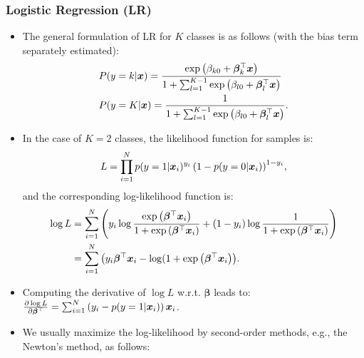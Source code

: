         \subsubsection{Logistic Regression (LR)}
            \begin{itemize}
                \item The general formulation of LR for $K$ classes is as follows (with the bias term separately estimated):
                    \begin{equation}
                        \begin{aligned}
                            & P(y=k | \bm{x}) = \frac{  \text{exp}\left( \beta_{k0} + \bm{\beta}_k^\top \bm{x}  \right) }{1 + \sum_{l=1}^{K-1}{ \text{exp}\left( \beta_{l0} + \bm{\beta}_l^\top \bm{x}  \right)  }} \\
                            & P(y=K | \bm{x}) = \frac{1}{1 + \sum_{l=1}^{K-1}{ \text{exp}\left( \beta_{l0} + \bm{\beta}_l^\top \bm{x}  \right)  }}.
                        \end{aligned}
                    \end{equation}
                \item In the case of $K=2$ classes, the likelihood function for \ndata samples is:
                    \begin{equation}
                        L = \prod_{i=1}^{N}{p(y=1 | \bm{x}_i)^{y_i} \left( 1-p(y=0 | \bm{x}_i) \right)^{1-y_i} },
                    \end{equation}
                and the corresponding log-likelihood function is:
                    \begin{equation}
                        \begin{aligned}
                        \log L & = \sum_{i=1}^{N}{\left( y_i \log\frac{ \text{exp}\left( \bm{\beta}^\top\bm{x}_i \right) }{1 +  \text{exp}\left( \bm{\beta}^\top \bm{x}_i  \right) }  + (1-y_i)\log\frac{1}{1+ \text{exp}\left( \bm{\beta}^\top \bm{x}_i \right) } \right) }  \\
                              & = \sum_{i=1}^{N}{\left( y_i \bm{\beta}^\top \bm{x}_i -\log(1 +  \text{exp}\left( \bm{\beta}^\top \bm{x}_i \right)  \right)}.
                        \end{aligned}
                    \end{equation}
                \item Computing the derivative of $\log L$ w.r.t. $\bm{\beta}$ leads to: 
                $\frac{\partial \log L}{\partial \bm{\beta}^\top} = \sum_{i=1}^{N}{\left( y_i - p(y=1|\bm{x}_i) \right) \bm{x}_i }$.
                \item We usually maximize the log-likelihood by second-order methods, e.g., the Newton's method, as follows:

\end{itemize}

